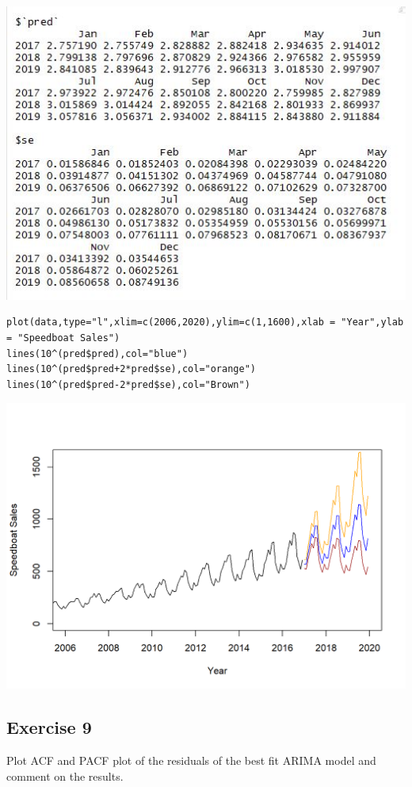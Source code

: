 \documentclass[a4paper,12pt]{article}
\begin{document}
\includegraphics[]{00-B2/images/Preds_SE.JPG}
\newpage 
\begin{framed}
\begin{verbatim}
plot(data,type="l",xlim=c(2006,2020),ylim=c(1,1600),xlab = "Year",ylab = "Speedboat Sales")
lines(10^(pred$pred),col="blue")
lines(10^(pred$pred+2*pred$se),col="orange")
lines(10^(pred$pred-2*pred$se),col="Brown")

\end{verbatim}
\end{framed}
\includegraphics[]{00-B2/images/Speedboat_Sales_forecast.png}

\newpage 



\subsection*{Exercise 9}
\noindent Plot ACF and PACF plot of the residuals of the best fit ARIMA model and comment
on the results.
\end{document}
